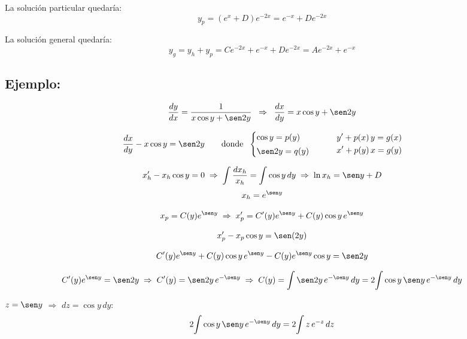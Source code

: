 \documentclass[a4paper,12pt]{article}
\begin{document}
La solución particular quedaría:
\[
y_p = (e^x + D)e^{-2x} = e^{-x} + De^{-2x}
\]

La solución general quedaría:
\[
y_g = y_h + y_p = Ce^{-2x} + e^{-x} + De^{-2x}
= Ae^{-2x} + e^{-x}
\]
\subsection*{Ejemplo:}

\[
\frac{dy}{dx}=\frac{1}{x\cos y+\sen 2y}
\;\;\Rightarrow\;\;
\frac{dx}{dy}=x\cos y+\sen 2y
\]

\[
\frac{dx}{dy}-x\cos y=\sen 2y
\qquad
\text{donde }\;
\begin{cases}
\cos y = p(y)\\[2pt]
\sen 2y = q(y)
\end{cases}
\qquad
\begin{aligned}
&y'+p(x)\,y=g(x)\\
&x'+p(y)\,x=g(y)
\end{aligned}
\]

\[
x_h'-x_h\cos y=0
\;\Rightarrow\;
\int \frac{dx_h}{x_h}=\int \cos y\,dy
\;\Rightarrow\;
\ln x_h=\sen y + D
\]
\[
x_h=e^{\sen y}
\]

\[
x_p=C(y)e^{\sen y}
\;\Rightarrow\;
x_p'=C'(y)e^{\sen y}+C(y)\cos y\,e^{\sen y}
\]

\[
x_p'-x_p\cos y=\sen(2y)
\]

\[
C'(y)e^{\sen y}+C(y)\cos y\,e^{\sen y}-C(y)e^{\sen y}\cos y=\sen 2y
\]

\[
C'(y)e^{\sen y}=\sen 2y
\;\Rightarrow\;
C'(y)=\sen 2y\,e^{-\sen y}
\;\Rightarrow\;
C(y)=\int \sen 2y\,e^{-\sen y}\,dy
=2\!\int \cos y\,\sen y\,e^{-\sen y}\,dy
\]

 \(z=\sen y\) \(\Rightarrow\) \(dz=\cos y\,dy\):
\[
2\!\int \cos y\,\sen y\,e^{-\sen y}\,dy
=2\!\int z\,e^{-z}\,dz
\]
\end{document}
